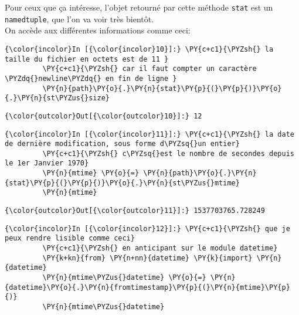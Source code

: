     Pour ceux que ça intéresse, l'objet retourné par cette méthode
\texttt{stat} est un \texttt{namedtuple}, que l'on va voir très bientôt.\\

On accède aux différentes informations comme ceci:

    \begin{Verbatim}[commandchars=\\\{\}]
{\color{incolor}In [{\color{incolor}10}]:} \PY{c+c1}{\PYZsh{} la taille du fichier en octets est de 11 }
         \PY{c+c1}{\PYZsh{} car il faut compter un caractère \PYZdq{}newline\PYZdq{} en fin de ligne }
         \PY{n}{path}\PY{o}{.}\PY{n}{stat}\PY{p}{(}\PY{p}{)}\PY{o}{.}\PY{n}{st\PYZus{}size}
\end{Verbatim}


\begin{Verbatim}[commandchars=\\\{\}]
{\color{outcolor}Out[{\color{outcolor}10}]:} 12
\end{Verbatim}
            
    \begin{Verbatim}[commandchars=\\\{\}]
{\color{incolor}In [{\color{incolor}11}]:} \PY{c+c1}{\PYZsh{} la date de dernière modification, sous forme d\PYZsq{}un entier}
         \PY{c+c1}{\PYZsh{} c\PYZsq{}est le nombre de secondes depuis le 1er Janvier 1970}
         \PY{n}{mtime} \PY{o}{=} \PY{n}{path}\PY{o}{.}\PY{n}{stat}\PY{p}{(}\PY{p}{)}\PY{o}{.}\PY{n}{st\PYZus{}mtime}
         \PY{n}{mtime}
\end{Verbatim}


\begin{Verbatim}[commandchars=\\\{\}]
{\color{outcolor}Out[{\color{outcolor}11}]:} 1537703765.728249
\end{Verbatim}
            
    \begin{Verbatim}[commandchars=\\\{\}]
{\color{incolor}In [{\color{incolor}12}]:} \PY{c+c1}{\PYZsh{} que je peux rendre lisible comme ceci}
         \PY{c+c1}{\PYZsh{} en anticipant sur le module datetime}
         \PY{k+kn}{from} \PY{n+nn}{datetime} \PY{k}{import} \PY{n}{datetime}
         \PY{n}{mtime\PYZus{}datetime} \PY{o}{=} \PY{n}{datetime}\PY{o}{.}\PY{n}{fromtimestamp}\PY{p}{(}\PY{n}{mtime}\PY{p}{)}
         \PY{n}{mtime\PYZus{}datetime}
\end{Verbatim}


